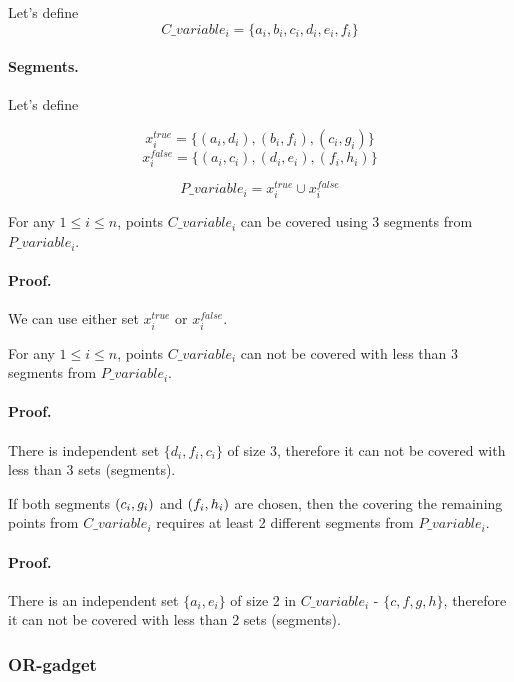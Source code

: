 Let's define $$C\_variable_i =  \{a_i, b_i, c_i, d_i, e_i, f_i\}$$	


\paragraph{Segments.}

Let's define 

$$x^{true}_i =\{ (a_i, d_i), (b_i, f_i), (c_i, g_i)\}$$
$$x^{false}_i = \{(a_i, c_i), (d_i, e_i), (f_i, h_i)\}$$

$$P\_variable_i = x^{true}_i \cup x^{false}_i$$


\begin{lemma}
\label{choose_variables_solution}
For any $1 \le i \le n$, points $C\_variable_i$
can be covered using 3 segments from $P\_variable_i$.
\end{lemma}

\paragraph{Proof.}
We can use either set $x^{true}_i$ or $x^{false}_i$.


\begin{lemma}
\label{choose_variables_no_less}
For any $1 \le i \le n$, points $C\_variable_i$
can not be covered with less than 3 segments from $P\_variable_i$.
\end{lemma}

\paragraph{Proof.}
There is independent set $\{d_i, f_i, c_i\}$ of size 3, therefore it can
not be covered with less than 3 sets (segments).


\begin{lemma}
\label{choose_variables_both}
If both segments $(c_i, g_i)$ and $(f_i, h_i)$ are chosen, then
the covering the remaining points from $C\_variable_i$
requires at least 2 different
segments from $P\_variable_i$.
\end{lemma}
\paragraph{Proof.}
There is an independent set $\{a_i, e_i\}$ of size 2
in $C\_variable_i$ - $\{c, f, g, h\}$,
therefore it can not be covered with less than 2 sets (segments).


\subsubsection{OR-gadget}

